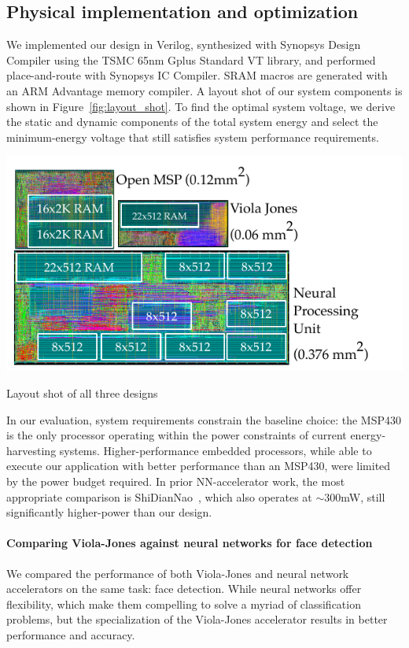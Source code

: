 \subsection{Physical implementation and optimization}

We implemented our design in Verilog, synthesized with Synopsys Design Compiler using the TSMC 65nm Gplus Standard VT library, and performed place-and-route with Synopsys IC Compiler. SRAM macros are generated with an ARM Advantage memory compiler. A layout shot of our system components is shown in Figure~\ref{fig:layout_shot}. To find the optimal system voltage, we derive the static and dynamic components of the total system energy and select the minimum-energy voltage that still satisfies system performance requirements.

\begin{marginfigure}
\centering
    \begin{center}
      \includegraphics[width=1.2\textwidth]{nsp-figs/layout.pdf}
    \end{center}
    \caption{Layout shot of all three designs}
    \label{fig:layout_shot}
\end{marginfigure}


In our evaluation, system requirements constrain the baseline choice: the MSP430 is the only processor operating within the power constraints of current energy-harvesting systems.
Higher-performance embedded processors, while able to execute our application with better performance than an MSP430, were limited by the power budget required.
In prior NN-accelerator work, the most appropriate comparison is ShiDianNao~\cite{shidiannao}, which also operates at $ \sim$300mW, still significantly higher-power than our design.

\paragraph{Comparing Viola-Jones against neural networks for face detection}
We compared the performance of both Viola-Jones and neural network accelerators
on the same task: face detection. While neural networks offer flexibility,
which make them compelling to solve a myriad of classification problems, but the
specialization of the Viola-Jones accelerator results in better performance and
accuracy.

